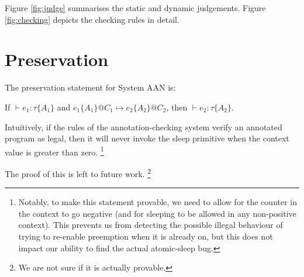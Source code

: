 \documentclass{article}
\begin{document}
Figure \ref{fig:judge} summarises the static and dynamic judgements.
Figure \ref{fig:checking} depicts the checking rules in detail.

\section{Preservation}

The preservation statement for System AAN is:

\begin{center}
	If $\vdash e_1 : \tau\{A_1\}$ and $e_1\{A_1\}@C_1 \mapsto e_2\{A_2\}@C_2$, then $\vdash e_2 : \tau\{A_2\}$.
\end{center}

Intuitively, if the rules of the annotation-checking system verify an annotated program as legal, then it will never invoke the {\sf sleep} primitive when the context value is greater than zero.
\footnote{Notably, to make this statement provable, we need to allow for the counter in the context to go negative (and for sleeping to be allowed in any non-positive context). This prevents us from detecting the possible illegal behaviour of trying to re-enable preemption when it is already on, but this does not impact our ability to find the actual atomic-sleep bug.}

The proof of this is left to future work.
\footnote{We are not sure if it is actually provable.}
\end{document}
